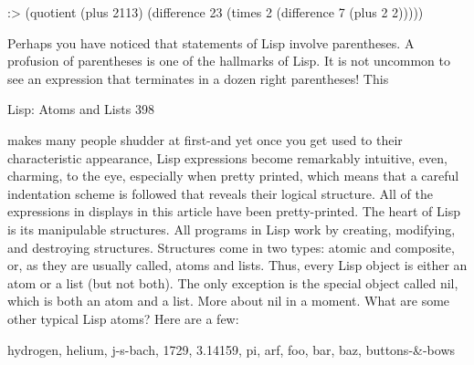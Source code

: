 :> (quotient (plus 2113) (difference 23 (times 2 (difference 7 (plus 2 2)))))

       Perhaps you have noticed that statements of Lisp involve parentheses. A
profusion of parentheses is one of the hallmarks of Lisp. It is not uncommon to see an
expression that terminates in a dozen right parentheses! This




Lisp: Atoms and Lists                                                                 398

makes many people shudder at first-and yet once you get used to their characteristic
appearance, Lisp expressions become remarkably intuitive, even, charming, to the
eye, especially when pretty printed, which means that a careful indentation scheme is
followed that reveals their logical structure. All of the expressions in displays in this
article have been pretty-printed.
        The heart of Lisp is its manipulable structures. All programs in Lisp work by
creating, modifying, and destroying structures. Structures come in two types: atomic
and composite, or, as they are usually called, atoms and lists. Thus, every Lisp object
is either an atom or a list (but not both). The only exception is the special object called
nil, which is both an atom and a list. More about nil in a moment. What are some
other typical Lisp atoms? Here are a few:

                    hydrogen, helium, j-s-bach, 1729, 3.14159, pi,
                         arf, foo, bar, baz, buttons-\&-bows

